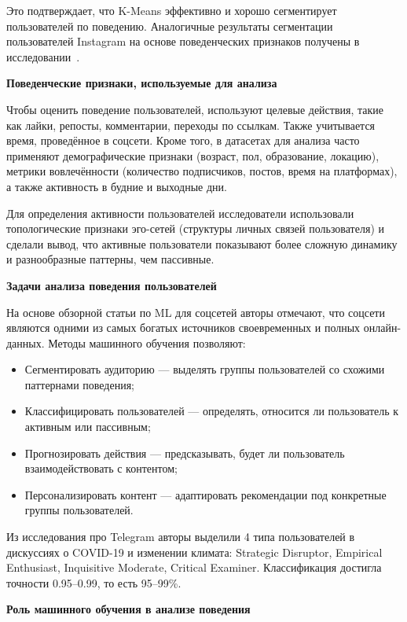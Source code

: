 \documentclass[14pt, a4paper]{extarticle}
\begin{document}
Это подтверждает, что K-Means эффективно и хорошо сегментирует пользователей по поведению.
Аналогичные результаты сегментации пользователей Instagram на основе поведенческих признаков получены в исследовании~\cite{instagram2020}.

\textbf{Поведенческие признаки, используемые для анализа}
\smallskip

Чтобы оценить поведение пользователей, используют целевые действия, такие как лайки, репосты, комментарии,
переходы по ссылкам. Также учитывается время, проведённое в соцсети.
Кроме того, в датасетах для анализа часто применяют демографические признаки (возраст, пол, образование,
локацию), метрики вовлечённости (количество подписчиков, постов, время на платформах), а также активность
в будние и выходные дни.

Для определения активности пользователей исследователи использовали топологические признаки эго-сетей (структуры личных связей пользователя) и сделали вывод, что активные пользователи показывают более сложную динамику и разнообразные паттерны, чем пассивные.

\textbf{Задачи анализа поведения пользователей}
\smallskip

На основе обзорной статьи по ML для соцсетей авторы отмечают, что соцсети являются одними из самых богатых источников своевременных и полных онлайн-данных. Методы машинного обучения позволяют:

\begin{itemize}
    \item Сегментировать аудиторию --- выделять группы пользователей со схожими паттернами поведения;
    \item Классифицировать пользователей --- определять, относится ли пользователь к активным или пассивным;
    \item Прогнозировать действия --- предсказывать, будет ли пользователь взаимодействовать с контентом;
    \item Персонализировать контент --- адаптировать рекомендации под конкретные группы пользователей.
\end{itemize}

Из исследования про Telegram авторы выделили 4 типа пользователей в дискуссиях о COVID-19 и изменении климата: Strategic Disruptor, Empirical Enthusiast, Inquisitive Moderate, Critical Examiner. Классификация достигла точности 0.95–0.99, то есть 95–99\%.

\textbf{Роль машинного обучения в анализе поведения}
\smallskip
\end{document}
